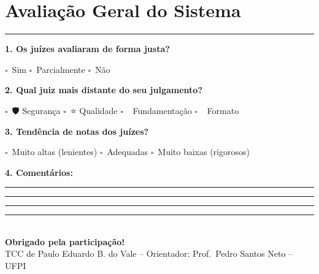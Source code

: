\documentclass[12pt,a4paper]{article}
\begin{document}
\newpage

\section*{Avaliação Geral do Sistema}
\rule{\textwidth}{0.5pt}
\vspace{4mm}

\noindent\textbf{1. Os juízes avaliaram de forma justa?}

\vspace{2mm}
\noindent
$\square$~Sim \hfill
$\square$~Parcialmente \hfill
$\square$~Não

\vspace{5mm}
\noindent\textbf{2. Qual juiz mais distante do seu julgamento?}

\vspace{2mm}
\noindent
$\square$~🛡️ Segurança \hfill
$\square$~⭐ Qualidade \hfill
$\square$~📎 Fundamentação \hfill
$\square$~📐 Formato

\vspace{5mm}
\noindent\textbf{3. Tendência de notas dos juízes?}

\vspace{2mm}
\noindent
$\square$~Muito altas (lenientes) \hfill
$\square$~Adequadas \hfill
$\square$~Muito baixas (rigorosos)

\vspace{5mm}
\noindent\textbf{4. Comentários:}
\vspace{2cm}
\noindent\rule{\textwidth}{0.3pt}
\vspace{5mm}
\noindent\rule{\textwidth}{0.3pt}
\vspace{5mm}
\noindent\rule{\textwidth}{0.3pt}

\vspace{4mm}
\begin{center}
\end{center}

\vfill
\begin{center}
\rule{0.5\textwidth}{0.5pt}\\[4mm]
\textbf{Obrigado pela participação!}\\[2mm]
\small TCC de Paulo Eduardo B. do Vale -- Orientador: Prof.~Pedro
Santos Neto -- UFPI
\end{center}
\end{document}
